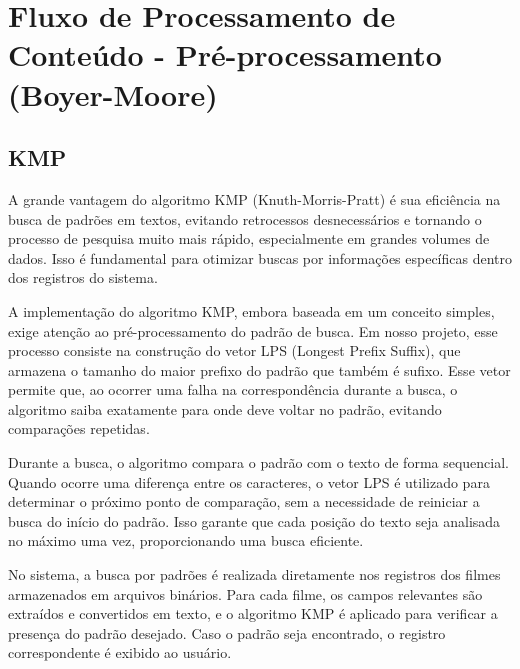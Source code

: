 \documentclass[12pt]{article}
\begin{document}
\section*{Fluxo de Processamento de Conteúdo - Pré-processamento (Boyer-Moore)} 
\begin{center} 
\end{center}

\subsection*{KMP}
A grande vantagem do algoritmo KMP (Knuth-Morris-Pratt) é sua eficiência na busca de padrões em textos, evitando retrocessos desnecessários e tornando o processo de pesquisa muito mais rápido, especialmente em grandes volumes de dados. Isso é fundamental para otimizar buscas por informações específicas dentro dos registros do sistema.

A implementação do algoritmo KMP, embora baseada em um conceito simples, exige atenção ao pré-processamento do padrão de busca. Em nosso projeto, esse processo consiste na construção do vetor LPS (Longest Prefix Suffix), que armazena o tamanho do maior prefixo do padrão que também é sufixo. Esse vetor permite que, ao ocorrer uma falha na correspondência durante a busca, o algoritmo saiba exatamente para onde deve voltar no padrão, evitando comparações repetidas.

Durante a busca, o algoritmo compara o padrão com o texto de forma sequencial. Quando ocorre uma diferença entre os caracteres, o vetor LPS é utilizado para determinar o próximo ponto de comparação, sem a necessidade de reiniciar a busca do início do padrão. Isso garante que cada posição do texto seja analisada no máximo uma vez, proporcionando uma busca eficiente.

No sistema, a busca por padrões é realizada diretamente nos registros dos filmes armazenados em arquivos binários. Para cada filme, os campos relevantes são extraídos e convertidos em texto, e o algoritmo KMP é aplicado para verificar a presença do padrão desejado. Caso o padrão seja encontrado, o registro correspondente é exibido ao usuário.
\end{document}
